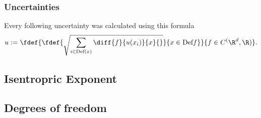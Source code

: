 \documentclass[../main.tex]{subfiles}
\begin{document}
    \subsubsection*{Uncertainties}
        Every following uncertainty was calculated using this formula
        \[u:=\fdef{\fdef{\sqrt{\sum_{i\in\text{Def}(x)}\diff{f}{u(x_i)}{x}{}}}{x\in\text{Def}{f}}}{f\in C^(\R^d,\R)}.\]
		        
        
    \subsection{Isentropric Exponent}

    \subsection{Degrees of freedom}
        
        
\end{document}
